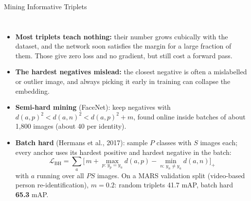 \begin{frame}{Mining Informative Triplets}
  \begin{columns}[T,onlytextwidth]
      \begin{itemize}\footnotesize\itemsep0.35em
        \item \textbf{Most triplets teach nothing:} their number grows cubically with the dataset, and the network soon satisfies the margin for a large fraction of them. Those give zero loss and no gradient, but still cost a forward pass.
        \item \textbf{The hardest negatives mislead:} the closest negative is often a mislabelled or outlier image, and always picking it early in training can collapse the embedding.
        \item \textbf{Semi-hard mining} (FaceNet): keep negatives with $d(a,p)^2<d(a,n)^2<d(a,p)^2+m$, found online inside batches of about 1{,}800 images (about 40 per identity).
        \item \textbf{Batch hard} (Hermans et al., 2017): sample $P$ classes with $S$ images each; every anchor uses its hardest positive and hardest negative in the batch:
        \[ \mathcal{L}_{\text{BH}}=\sum_{a}\Big[\,m+\max_{p:\,y_p=y_a}d(a,p)-\min_{n:\,y_n\neq y_a}d(a,n)\Big]_+ \]
        with $a$ running over all $PS$ images. On a MARS validation split (video-based person re-identification), $m=0.2$: random triplets 41.7 mAP, batch hard \textbf{65.3} mAP.
      \end{itemize}
      \centering
      \vspace{0.4em}
\end{columns}
\end{frame}
